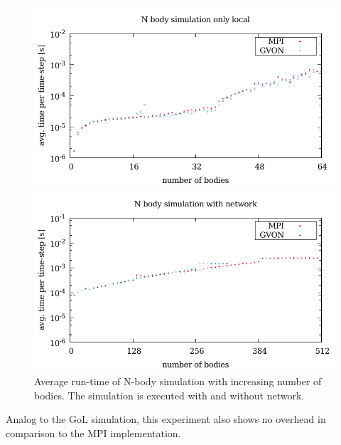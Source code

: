 \begin{figure}[H]
  \begin{minipage}[t]{0.5\textwidth}
    \includegraphics[width=\textwidth]{plots/50_nbody_laser}
  \end{minipage}%
  \begin{minipage}[t]{0.5\textwidth}
    \includegraphics[width=\textwidth]{plots/50_nbody_network_laser}
  \end{minipage}%
  \label{fig:nbody_laser}
  \caption{Average run-time of N-body simulation with increasing
    number of bodies. The simulation is executed with and without
    network.}
\end{figure}

Analog to the GoL simulation, this experiment also shows no overhead
in comparison to the MPI implementation.

